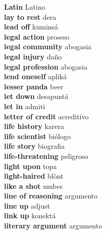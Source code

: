 \textbf{ Latin  } Latino \\
\textbf{ lay to rest  } dera \\
\textbf{ lead off  } kuminsá \\
\textbf{ legal action  } proseso \\
\textbf{ legal community  } abogasia \\
\textbf{ legal injury  } daño \\
\textbf{ legal profession  } abogasia \\
\textbf{ lend oneself  } apliká \\
\textbf{ lesser panda  } beer \\
\textbf{ let down  } desapuntá \\
\textbf{ let in  } admiti \\
\textbf{ letter of credit  } acreditivo \\
\textbf{ life history  } karera \\
\textbf{ life scientist  } biólogo \\
\textbf{ life story  } biografia \\
\textbf{ life-threatening  } peligroso \\
\textbf{ light upon  } topa \\
\textbf{ light-haired  } blònt \\
\textbf{ like a shot  } umbes \\
\textbf{ line of reasoning  } argumento \\
\textbf{ line up  } adjust \\
\textbf{ link up  } konektá \\
\textbf{ literary argument  } argumento \\
